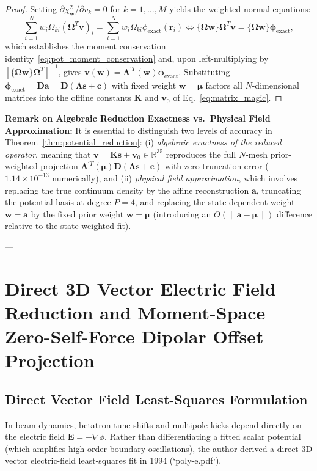 \documentclass[11pt,a4paper]{article}
\newcommand{\bOmega}{\mathbf{\Omega}}
\newcommand{\bLambda}{\mathbf{\Lambda}}
\begin{document}
\begin{proof}
Setting $\partial \chi^2_{\bm{w}} / \partial v_k = 0$ for $k = 1, \dots, M$ yields the weighted normal equations:
\begin{equation}
    \sum_{i=1}^N w_i \Omega_{ki} \left( \bm{\Omega}^T \bm{v} \right)_i = \sum_{i=1}^N w_i \Omega_{ki} \phi_{\mathrm{exact}}(\bm{r}_i) \iff \{\bOmega\bm{w}\} \bOmega^T \bm{v} = \{\bOmega\bm{w}\} \bm{\phi}_{\mathrm{exact}},
    \label{eq:pot_normal}
\end{equation}
which establishes the moment conservation identity~\eqref{eq:pot_moment_conservation} and, upon left-multiplying by $[\{\bOmega\bm{w}\}\bOmega^T]^{-1}$, gives $\bm{v}(\bm{w}) = \bLambda^{\prime T}(\bm{w})\bm{\phi}_{\mathrm{exact}}$. Substituting $\bm{\phi}_{\mathrm{exact}} = \bm{D}\bm{a} = \bm{D}(\bLambda\bm{s} + \bm{c})$ with fixed weight $\bm{w} = \bm{\mu}$ factors all $N$-dimensional matrices into the offline constants $\bm{K}$ and $\bm{v}_0$ of Eq.~\eqref{eq:matrix_magic}.
\end{proof}

\noindent\textbf{Remark on Algebraic Reduction Exactness vs.\ Physical Field Approximation:}
It is essential to distinguish two levels of accuracy in Theorem~\ref{thm:potential_reduction}: (i) \emph{algebraic exactness of the reduced operator}, meaning that $\bm{v} = \bm{K}\bm{s} + \bm{v}_0 \in \mathbb{R}^{35}$ reproduces the full $N$-mesh prior-weighted projection $\bLambda^{\prime T}(\bm{\mu})\bm{D}(\bLambda\bm{s} + \bm{c})$ with zero truncation error ($1.14 \times 10^{-13}$ numerically), and (ii) \emph{physical field approximation}, which involves replacing the true continuum density by the affine reconstruction $\bm{a}$, truncating the potential basis at degree $P=4$, and replacing the state-dependent weight $\bm{w}=\bm{a}$ by the fixed prior weight $\bm{w}=\bm{\mu}$ (introducing an $O(\|\bm{a} - \bm{\mu}\|)$ difference relative to the state-weighted fit).

---

\section{Direct 3D Vector Electric Field Reduction and Moment-Space Zero-Self-Force Dipolar Offset Projection}

\subsection{Direct Vector Field Least-Squares Formulation}
In beam dynamics, betatron tune shifts and multipole kicks depend directly on the electric field $\bm{E} = -\nabla \phi$. Rather than differentiating a fitted scalar potential (which amplifies high-order boundary oscillations), the author derived a direct 3D vector electric-field least-squares fit in 1994 (`poly-e.pdf`).
\end{document}
